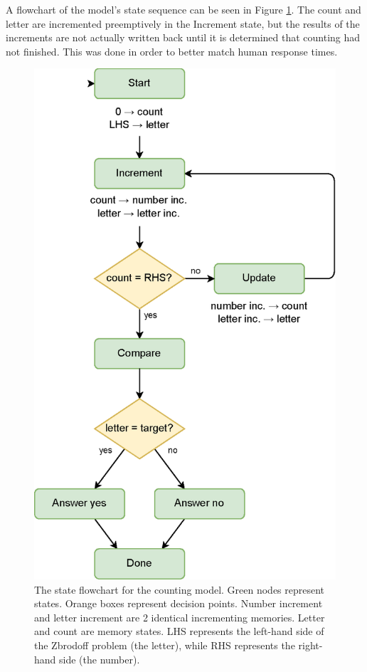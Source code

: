 \documentclass[10pt, a4paper, twocolumn]{article}
\begin{document}
A flowchart of the model's state sequence can be seen in Figure \ref{fig:counting-model}. The count and letter are incremented preemptively in the Increment state, but the results of the increments are not actually written back until it is determined that counting had not finished. This was done in order to better match human response times.

\begin{figure}[h]
	\centering
	\includegraphics[width=0.8\linewidth]{figures/counting-model.eps}
	\caption{The state flowchart for the counting model. Green nodes represent states. Orange boxes represent decision points. Number increment and letter increment are 2 identical incrementing memories. Letter and count are memory states. LHS represents the left-hand side of the Zbrodoff problem (the letter), while RHS represents the right-hand side (the number).}
	\label{fig:counting-model}
\end{figure}
\end{document}
